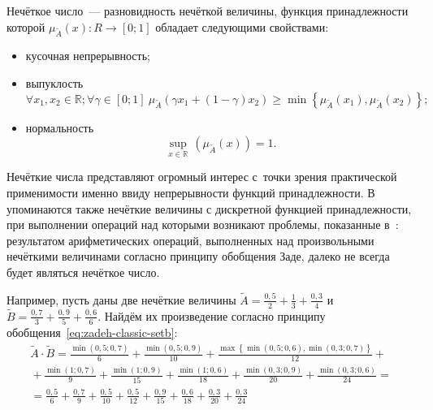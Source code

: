 \begin{mydef}
Нечёткое число~--- разновидность нечёткой величины, функция принадлежности которой $\mu_{\tilde A}\left( x \right):R\to \left[ 0;1 \right]$ обладает следующими свойствами:
\begin{itemize}
	\item кусочная непрерывность;
	\item выпуклость
	\begin{equation}
		\label{eq:convex-set}
			 \forall x_1, x_2 \in \mathbb{R}; \forall \gamma \in \left[ 0;1 \right]\ \mu_{\tilde A}\left( \gamma x_1+\left( 1-\gamma  \right)x_2 \right)\geqslant \min \left\{ \mu_{\tilde A}\left( x_1 \right),\mu_{\tilde A}\left( x_2 \right) \right\};
	\end{equation}
	\item нормальность
	\begin{equation}
		\label{eq:normal-set}
		\underset{x\in \mathbb{R}}{\mathop {\sup}}{}\, \left( \mu_{\tilde A} \left( x \right) \right)=1.
	\end{equation}
\end{itemize}
\end{mydef}

Нечёткие числа представляют огромный интерес с~точки зрения практической применимости именно ввиду непрерывности функций принадлежности. В~\cite{Zimmermann} упоминаются также нечёткие величины с дискретной функцией принадлежности, при выполнении операций над которыми возникают проблемы, показанные в~\cite{Rutkovskaya}: результатом арифметических операций, выполненных над произвольными нечёткими величинами согласно принципу обобщения Заде, далеко не всегда будет являться нечёткое число. 

Например, пусть даны две нечёткие величины $\displaystyle \tilde{A}=\frac{0,5}{2}+\frac{1}{3}+\frac{0,3}{4}$ и $\displaystyle \tilde{B}=\frac{0,7}{3}+\frac{0,9}{5}+\frac{0,6}{6}$. Найдём их произведение согласно принципу обобщения~\eqref{eq:zadeh-classic-setb}:
\begin{gather*}
	\tilde{A}\cdot \tilde{B}=\frac{\min \left( 0,5;0,7 \right)}{6}+\frac{\min \left( 0,5;0,9 \right)}{10}+\frac{\max \left\{\min \left( 0,5;0,6 \right),\min \left( 0,3;0,7 \right) \right\}}{12}+{} \\
	{} +\frac{\min \left( 1;0,7 \right)}{9}+\frac{\min \left( 1;0,9 \right)}{15}+\frac{\min \left( 1;0,6 \right)}{18}+\frac{\min \left( 0,3;0,9 \right)}{20}+\frac{\min \left( 0,3;0,6 \right)}{24}={} \\
	{}=\frac{0,5}{6}+\frac{0,7}{9}+\frac{0,5}{10}+\frac{0,5}{12}+\frac{0,9}{15}+\frac{0,6}{18}+\frac{0,3}{20}+\frac{0,3}{24}
\end{gather*}

